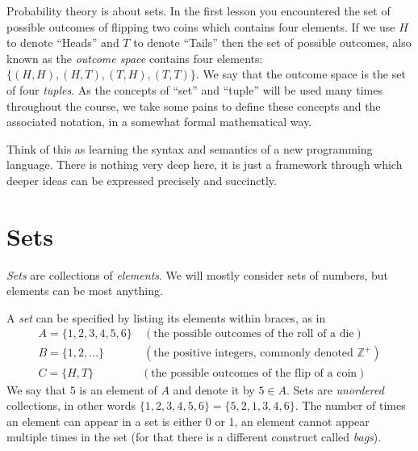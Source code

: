 \documentclass{report}
\theoremstyle{plain}
\theoremstyle{definition}
\begin{document}
\lecturer{}
\scribe{}

\maketitle

Probability theory is about sets. In the first lesson you encountered
the set of possible outcomes of flipping two coins which contains four
elements. If we use $H$ to denote ``Heads'' and $T$ to denote
``Tails'' then the set of possible outcomes, also known as the {\em
  outcome space} contains four elements: $\{(H,H),(H,T),(T,H),(T,T)\}$. We say
that the outcome space is the set of four {\em tuples}. As the
concepts of ``set'' and ``tuple'' will be used many times throughout
the course, we take some pains to define these concepts and the
associated notation, in a somewhat formal mathematical way.

Think of this as learning the syntax and semantics of a new
programming language. There is nothing very deep here, it is just a
framework through which deeper ideas can be expressed precisely and
succinctly.

  
\section{Sets}
{\it Sets} are collections of {\it elements}. We will mostly consider sets of
numbers, but elements can be most anything.

A {\it set} can be specified by listing its elements within braces, as in
\begin{align*}
A=\{1,2,3,4,5,6\} &\ (\mbox{the possible outcomes of the roll of a die}) \\
B=\{1,2,\ldots\}  &\ (\mbox{the positive integers, commonly denoted
  $\mathbb{Z}^+$}) \\
C=\{H,T\} & (\mbox{the possible outcomes of the flip of a coin}) 
\end{align*}
We say that $5$ is an element of $A$ and denote it by $5 \in A$. Sets
are {\em unordered} collections, in other words $\{1,2,3,4,5,6\} =
\{5,2,1,3,4,6\}$. The number of times an element can appear in a set
is either 0 or 1, an element cannot appear multiple times in the set
(for that there is a different construct called {\em bags}).
\end{document}
